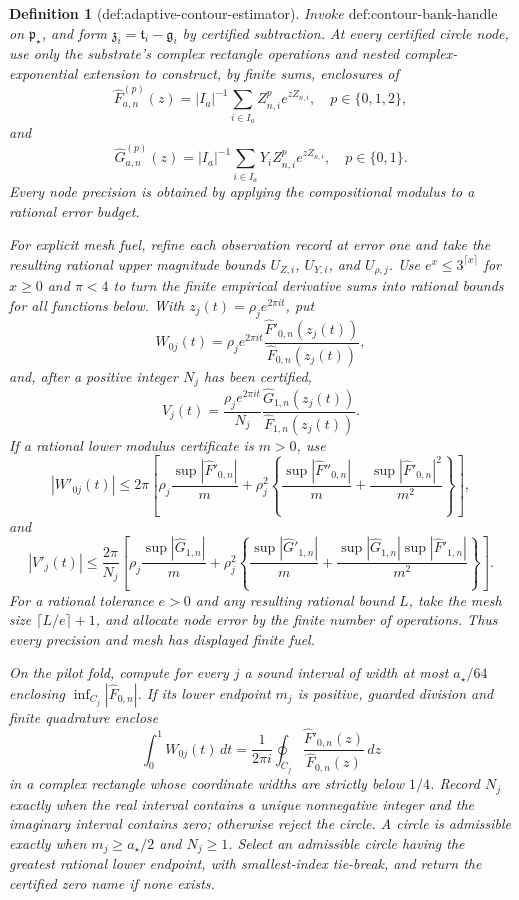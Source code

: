 \documentclass{article}
\newtheorem{definition}{Definition}
\begin{document}
\begin{definition}[def:adaptive-contour-estimator]
Invoke \(\text{def:contour-bank-handle}\) on \(\mathfrak p_{\star}\), and form \(\mathfrak z_i=\mathfrak t_i-\mathfrak g_i\) by certified subtraction.  At every certified circle node, use only the substrate's complex rectangle operations and nested complex-exponential extension to construct, by finite sums, enclosures of
\[
 \widehat F_{a,n}^{(p)}(z)
 =|I_a|^{-1}\sum_{i\in I_a}Z_{n,i}^{p}e^{zZ_{n,i}},
 \quad p\in\{0,1,2\},
\]
and
\[
 \widehat G_{a,n}^{(p)}(z)
 =|I_a|^{-1}\sum_{i\in I_a}Y_iZ_{n,i}^{p}e^{zZ_{n,i}},
 \quad p\in\{0,1\}.
\]
Every node precision is obtained by applying the compositional modulus to a rational error budget.

For explicit mesh fuel, refine each observation record at error one and take the resulting rational upper magnitude bounds \(U_{Z,i}\), \(U_{Y,i}\), and \(U_{\rho,j}\).  Use \(e^x\le3^{\lceil x\rceil}\) for \(x\ge0\) and \(\pi<4\) to turn the finite empirical derivative sums into rational bounds for all functions below.  With \(z_j(t)=\rho_je^{2\pi it}\), put
\[
 W_{0j}(t)=
 \rho_je^{2\pi it}
 \frac{\widehat F'_{0,n}(z_j(t))}
      {\widehat F_{0,n}(z_j(t))},
\]
and, after a positive integer \(N_j\) has been certified,
\[
 V_j(t)=
 \frac{\rho_je^{2\pi it}}{N_j}
 \frac{\widehat G_{1,n}(z_j(t))}
      {\widehat F_{1,n}(z_j(t))}.
\]
If a rational lower modulus certificate is \(m>0\), use
\[
 |W'_{0j}(t)|\le
 2\pi\left[
 \rho_j\frac{\sup|\widehat F'_{0,n}|}{m}
 +\rho_j^2\left\{
 \frac{\sup|\widehat F''_{0,n}|}{m}
 +\frac{\sup|\widehat F'_{0,n}|^2}{m^2}
 \right\}\right],
\]
and
\[
 |V'_j(t)|\le
 \frac{2\pi}{N_j}\left[
 \rho_j\frac{\sup|\widehat G_{1,n}|}{m}
 +\rho_j^2\left\{
 \frac{\sup|\widehat G'_{1,n}|}{m}
 +\frac{\sup|\widehat G_{1,n}|\sup|\widehat F'_{1,n}|}{m^2}
 \right\}\right].
\]
For a rational tolerance \(e>0\) and any resulting rational bound \(L\), take the mesh size \(\lceil L/e\rceil+1\), and allocate node error by the finite number of operations.  Thus every precision and mesh has displayed finite fuel.

On the pilot fold, compute for every \(j\) a sound interval of width at most \(a_{\star}/64\) enclosing \(\inf_{C_j}|\widehat F_{0,n}|\).  If its lower endpoint \(m_j\) is positive, guarded division and finite quadrature enclose
\[
 \int_0^1W_{0j}(t)\,dt
 =\frac{1}{2\pi i}\oint_{C_j}
   \frac{\widehat F'_{0,n}(z)}{\widehat F_{0,n}(z)}\,dz
\]
in a complex rectangle whose coordinate widths are strictly below \(1/4\).  Record \(N_j\) exactly when the real interval contains a unique nonnegative integer and the imaginary interval contains zero; otherwise reject the circle.  A circle is admissible exactly when \(m_j\ge a_{\star}/2\) and \(N_j\ge1\).  Select an admissible circle having the greatest rational lower endpoint, with smallest-index tie-break, and return the certified zero name if none exists.


\end{definition}
\end{document}
